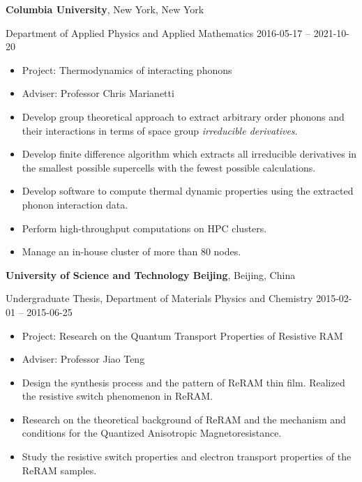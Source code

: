 \documentclass[
  a4paper,
  12pt
]{article}
\newcommand{\LongMonth}[1]{%
\ifcase#1\relax
\or January%
\or February%
\or March%
\or April%
\or May%
\or June%
\or July%
\or August%
\or September%
\or October%
\or November%
\or December%
\fi}
\newcommand{\ShortMonth}[1]{%
\ifcase#1\relax
\or Jan%
\or Feb%
\or Mar%
\or Apr%
\or May%
\or Jun%
\or Jul%
\or Aug%
\or Sep%
\or Oct%
\or Nov%
\or Dec%
\fi}
\newcommand{\DatestampYMD}[3]{\mbox{#1-#2-#3}}
\newcommand{\DatestampYMD}[3]{\mbox{\ShortMonth{#2} #1}}
\newcommand{\DatestampYMD}[3]{\mbox{\LongMonth{#2} #1}}
\newcommand{\DatestampYMD}[3]{#1}
\begin{document}
{\textbf{Columbia University}},
New York, New York

Department of Applied Physics and Applied Mathematics
\hfill
\DatestampYMD{2016}{05}{17} --
\DatestampYMD{2021}{10}{20}
\begin{itemize}
\item Project: Thermodynamics of interacting phonons
\item Adviser: Professor Chris Marianetti
\item Develop group theoretical approach to extract arbitrary order phonons and their interactions in terms of space group \emph{irreducible derivatives}.
\item Develop finite difference algorithm which extracts all irreducible derivatives in the smallest possible supercells with the fewest possible calculations.
\item Develop software to compute thermal dynamic properties using the extracted phonon interaction data.
\item Perform high-throughput computations on HPC clusters.
\item Manage an in-house cluster of more than 80 nodes.
\end{itemize}

{\textbf{University of Science and Technology Beijing}},
Beijing, China

Undergraduate Thesis,
Department of Materials Physics and Chemistry
\hfill
\DatestampYMD{2015}{02}{01} --
\DatestampYMD{2015}{06}{25}
\begin{itemize}
\item Project: Research on the Quantum Transport Properties of Resistive RAM
\item Adviser: Professor Jiao Teng
\item Design the synthesis process and the pattern of ReRAM thin film. Realized the resistive switch phenomenon in ReRAM.
\item Research on the theoretical background of ReRAM and the mechanism and conditions for the Quantized Anisotropic Magnetoresistance.
\item Study the resistive switch properties and electron transport properties of the ReRAM samples.
\end{itemize}
\end{document}
